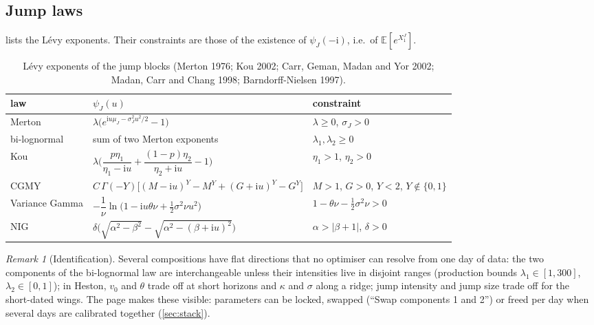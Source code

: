 \documentclass[11pt,a4paper]{article}
\theoremstyle{definition}
\theoremstyle{remark}
\newtheorem{remark}{Remark}
\newcommand{\E}{\mathbb{E}}
\newcommand{\ii}{\mathrm{i}}
\begin{document}
\subsection{Jump laws}
 lists the Lévy exponents. Their constraints are those of the existence of $\psi_J(-\ii)$, i.e.\ of $\E[e^{X^J_1}]$.
\begin{table}[ht]\centering\small
\renewcommand{\arraystretch}{1.35}
\begin{tabular}{@{}lll@{}}\toprule
law & $\psi_J(u)$ & constraint\\\midrule
Merton & $\lambda\big(e^{\ii u\mu_J-\sigma_J^2u^2/2}-1\big)$ & $\lambda\ge0$, $\sigma_J>0$\\
bi-lognormal & sum of two Merton exponents & $\lambda_1,\lambda_2\ge0$ \\
Kou & $\lambda\Big(\dfrac{p\eta_1}{\eta_1-\ii u}+\dfrac{(1-p)\eta_2}{\eta_2+\ii u}-1\Big)$ & $\eta_1>1$, $\eta_2>0$\\
CGMY & $C\,\Gamma(-Y)\big[(M-\ii u)^Y-M^Y+(G+\ii u)^Y-G^Y\big]$ & $M>1$, $G>0$, $Y<2$, $Y\notin\{0,1\}$\\
Variance Gamma & $-\dfrac1\nu\ln\Big(1-\ii u\theta\nu+\tfrac12\sigma^2\nu u^2\Big)$ & $1-\theta\nu-\tfrac12\sigma^2\nu>0$\\
NIG & $\delta\Big(\sqrt{\alpha^2-\beta^2}-\sqrt{\alpha^2-(\beta+\ii u)^2}\Big)$ & $\alpha>|\beta+1|$, $\delta>0$\\\bottomrule
\end{tabular}
\caption{Lévy exponents of the jump blocks (Merton 1976; Kou 2002; Carr, Geman, Madan and Yor 2002; Madan, Carr and Chang
1998; Barndorff-Nielsen 1997).}\label{tab:jumps}
\end{table}

\begin{remark}[Identification]
Several compositions have flat directions that no optimiser can resolve from one day of data: the two components of the
bi-lognormal law are interchangeable unless their intensities live in disjoint ranges (production bounds $\lambda_1\in[1,300]$,
$\lambda_2\in[0,1]$); in Heston, $v_0$ and $\theta$ trade off at short horizons and $\kappa$ and $\sigma$ along a ridge; jump
intensity and jump size trade off for the short-dated wings. The page makes these visible: parameters can be locked, swapped
(``Swap components 1 and 2'') or freed per day when several days are calibrated together (\cref{sec:stack}).
\end{remark}

\end{document}

